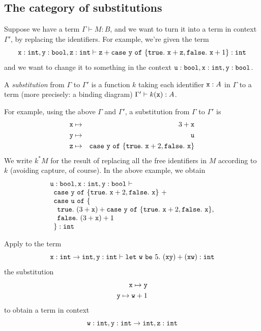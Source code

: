 \documentclass[runningheads,12pt]{llncs}
\newcommand{\ttletmac}[2]{\mathtt{let}\ {#2}\ \mathtt{be}\ {#1}.\ }
\begin{document}
\subsection{The  category of substitutions}

Suppose we have a term $\Gamma \vdash M  : B$, and we want to turn it into a term in context $\Gamma'$, by replacing the identifiers.  For example, we're given the term
\begin{displaymath}
  \mathtt{x}:\mathtt{int}, \mathtt{y}:\mathtt{bool}, \mathtt{z}:\mathtt{int} \vdash \mathtt{z} + \mathtt{case} \  \mathtt{y} \ \mathtt{of}\  \{\mathtt{true}.\ \mathtt{x}+\mathtt{z}, \mathtt{false}.\ \mathtt{x}+1 \} : \mathtt{int}
\end{displaymath}
and we want to change it to something in the context $\mathtt{u}:\mathtt{bool},  \mathtt{x}:\mathtt{int}, \mathtt{y}:\mathtt{bool} $.

A \emph{substitution} from $\Gamma$ to $\Gamma'$ is a function $k$ taking each identifier $\mathtt{x}:A$ in $\Gamma$ to a term (more precisely: a binding diagram) $\Gamma' \vdash k(\mathtt{x}):A$.


For example, using the above $\Gamma$ and $\Gamma'$, a substitution from $\Gamma$ to $\Gamma'$ is
\begin{eqnarray*}
  \mathtt{x} & \mapsto & 3+\mathtt{x} \\
  \mathtt{y} & \mapsto & \mathtt{u} \\
  \mathtt{z} & \mapsto & \mathtt{case} \  \mathtt{y} \ \mathtt{of}\  \{ \mathtt{true}.\ \mathtt{x}+2, \mathtt{false}.\ \mathtt{x}\}
\end{eqnarray*}
We write $k^{*}M$ for the result of replacing all the free identifiers in $M$ according to $k$ (avoiding capture, of course).  In the above example, we obtain
\begin{displaymath}
  \begin{array}{l}
 \ttu:\ttbool,  \ttx:\ttint, \tty:\ttbool \vdash\\
\beunixt \ttcase \tty \ttof \{ \tttrue.\ \ttx+2, \ttfalse.\ \ttx\}\  + \\ 
\beunixt \ttcase \ttu \ttof \{ \\
 \beunixt \beunixt \tttrue.\ (3+\ttx)+\ttcase \tty \ttof \{ \tttrue.\ \ttx+2, \ttfalse.\ \ttx\}, \\ 
\beunixt \beunixt \ttfalse.\ (3+\ttx)+1 \\
 \beunixt  \} : \ttint
\end{array}
\end{displaymath}


\begin{exercise}
  Apply to the term
  \begin{displaymath}
    \ttx : \ttint \rightarrow \ttint, \tty: \ttint \vdash \ttletmac{ 5 }{ \ttw  } (\ttx \tty) + (\ttx \ttw) : \ttint
  \end{displaymath}
the substitution
\begin{eqnarray*}
  \mathtt{x} \mapsto \mathtt{y} \\
 \mathtt{y} \mapsto \mathtt{w}+1
\end{eqnarray*}
to obtain a term in context
\begin{displaymath}
  \mathtt{w} : \mathtt{int}, \mathtt{y}: \mathtt{int} \rightarrow \mathtt{int}, \mathtt{z}:\mathtt{int}
\end{displaymath}
\end{exercise}
\end{document}

